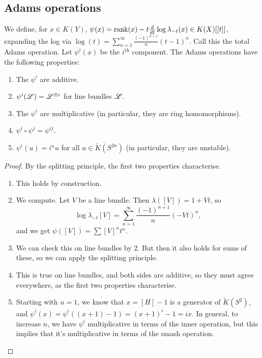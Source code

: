 \documentclass[11pt]{article}
\begin{document}
\begin{MarkusKtheory}
\subsection*{Adams operations}
We define, for $x\in K(Y)$, $\psi(x)=\operatorname{rank}(x)-t\frac{d}{dt}\log \lambda_{-t}(x)\in K(X)[[t]]$, expanding the log via $\log(t)=\sum_{n=1}^\infty \frac{(-1)^{n+1}}{n}(t-1)^n$. Call this the total Adams operation. Let $\psi^i(x)$ be the $i^\text{th}$ component. The Adams operations have the following properties:
\begin{enumerate}\squishlist
\item The $\psi^i$ are additive.
\item $\psi^i(\mathscr{L})=\mathscr{L}^{\otimes i}$ for line bundles $\mathscr{L}$.
\item The $\psi^i$ are multiplicative (in particular, they are ring homomorphisms).
\item $\psi^i\circ\psi^j=\psi^{ij}$.
\item $\psi^i(u)=i^nu$ for all $u\in\widetilde K(S^{2n})$ (in particular, they are unstable).
\end{enumerate}
\begin{proof}
By the splitting principle, the first two properties characterise.
\begin{enumerate}\squishlist
\item This holds by construction.
\item We compute. Let $V$ be a line bundle. Then $\lambda([V])=1+Vt$, so 
\[\log \lambda_{-t}[V]=\sum_{n=1}^\infty \frac{(-1)^{n+1}}{n}(-Vt)^n,\]
 and we get $\psi([V])=\sum [V]^nt^n$.
\item We can check this on line bundles by 2. But then it also holds for sums of these, so we can apply the splitting principle.
\item This is true on line bundles, and both sides are additive, so they must agree everywhere, as the first two properties characterise.
\item Starting with $n=1$, we know that $x=[H]-1$ is a generator of $\widetilde K(S^2)$, and $\psi^i(x)=\psi^i((x+1)-1)=(x+1)^i-1=ix$. In general, to increase $n$, we have $\psi^i$ multiplicative in terms of the inner operation, but this implies that it's multiplicative in terms of the smash operation.\qedhere
\end{enumerate}
\end{proof}

\pagebreak
\end{MarkusKtheory}
\end{document}
